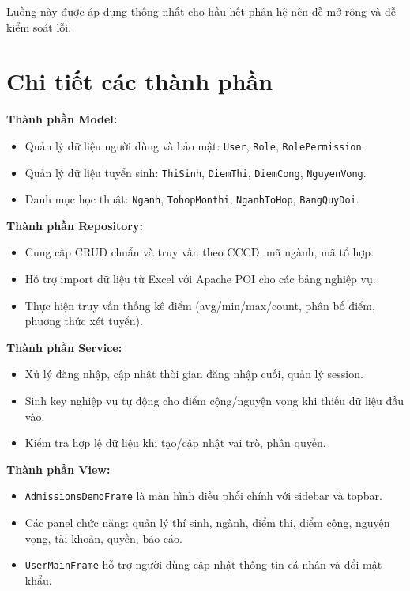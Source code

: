 \documentclass[12pt,a4paper,oneside]{report}
\begin{document}
Luồng này được áp dụng thống nhất cho hầu hết phân hệ nên dễ mở rộng và dễ kiểm soát lỗi.

\section{Chi tiết các thành phần}
\textbf{Thành phần Model:}
\begin{itemize}
  \item Quản lý dữ liệu người dùng và bảo mật: \texttt{User}, \texttt{Role}, \texttt{RolePermission}.
  \item Quản lý dữ liệu tuyển sinh: \texttt{ThiSinh}, \texttt{DiemThi}, \texttt{DiemCong}, \texttt{NguyenVong}.
  \item Danh mục học thuật: \texttt{Nganh}, \texttt{TohopMonthi}, \texttt{NganhToHop}, \texttt{BangQuyDoi}.
\end{itemize}

\textbf{Thành phần Repository:}
\begin{itemize}
  \item Cung cấp CRUD chuẩn và truy vấn theo CCCD, mã ngành, mã tổ hợp.
  \item Hỗ trợ import dữ liệu từ Excel với Apache POI cho các bảng nghiệp vụ.
  \item Thực hiện truy vấn thống kê điểm (avg/min/max/count, phân bố điểm, phương thức xét tuyển).
\end{itemize}

\textbf{Thành phần Service:}
\begin{itemize}
  \item Xử lý đăng nhập, cập nhật thời gian đăng nhập cuối, quản lý session.
  \item Sinh key nghiệp vụ tự động cho điểm cộng/nguyện vọng khi thiếu dữ liệu đầu vào.
  \item Kiểm tra hợp lệ dữ liệu khi tạo/cập nhật vai trò, phân quyền.
\end{itemize}

\textbf{Thành phần View:}
\begin{itemize}
  \item \texttt{AdmissionsDemoFrame} là màn hình điều phối chính với sidebar và topbar.
  \item Các panel chức năng: quản lý thí sinh, ngành, điểm thi, điểm cộng, nguyện vọng, tài khoản, quyền, báo cáo.
  \item \texttt{UserMainFrame} hỗ trợ người dùng cập nhật thông tin cá nhân và đổi mật khẩu.
\end{itemize}
\end{document}
